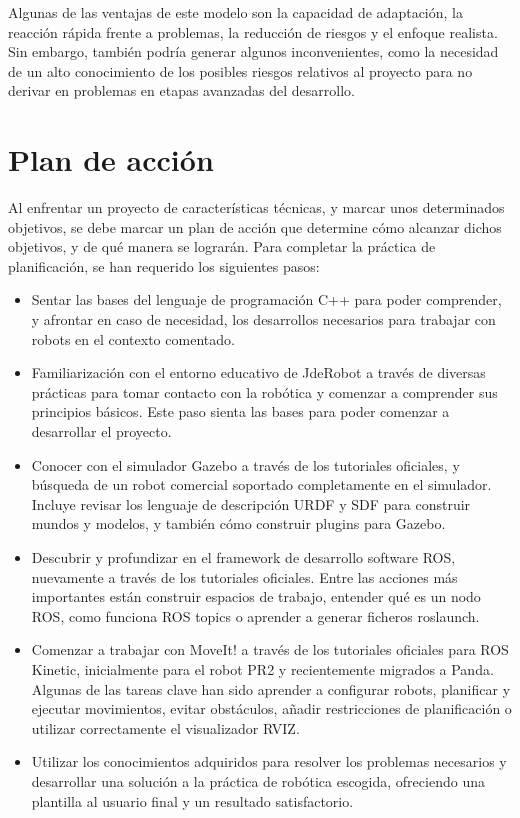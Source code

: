 \documentclass[12pt,spanish,chapterprefix, numbers=noenddot]{book}
\numberwithin{equation}{section}
\numberwithin{figure}{section}
\begin{document}
Algunas de las ventajas de este modelo son la capacidad de adaptación, la reacción rápida frente a problemas, la reducción de riesgos y el enfoque realista. Sin embargo, también podría generar algunos inconvenientes, como la necesidad de un alto conocimiento de los posibles riesgos relativos al proyecto para no derivar en problemas en etapas avanzadas del desarrollo. 

\section{Plan de acción}
Al enfrentar un proyecto de características técnicas, y marcar unos determinados objetivos, se debe marcar un plan de acción que determine cómo alcanzar dichos objetivos, y de qué manera se lograrán. Para completar la práctica de planificación, se han requerido los siguientes pasos: 
\begin{itemize}
    \item Sentar las bases del lenguaje de programación C++ para poder comprender, y afrontar en caso de necesidad, los desarrollos necesarios para trabajar con robots en el contexto comentado. 
    \item Familiarización con el entorno educativo de JdeRobot a través de diversas prácticas para tomar contacto con la robótica y comenzar a comprender sus principios básicos. Este paso sienta las bases para poder comenzar a desarrollar el proyecto. 
    \item Conocer con el simulador Gazebo a través de los tutoriales oficiales, y búsqueda de un robot comercial soportado completamente en el simulador. Incluye revisar los lenguaje de descripción URDF y SDF para construir mundos y modelos, y también cómo construir plugins para Gazebo. 
    \item Descubrir y profundizar en el framework de desarrollo software ROS, nuevamente a través de los tutoriales oficiales. Entre las acciones más importantes están construir espacios de trabajo, entender qué es un nodo ROS, como funciona ROS topics o aprender a generar ficheros roslaunch.
    \item Comenzar a trabajar con MoveIt! a través de los tutoriales oficiales para ROS Kinetic, inicialmente para el robot PR2 y recientemente migrados a Panda. Algunas de las tareas clave han sido aprender a configurar robots, planificar y ejecutar movimientos, evitar obstáculos, añadir restricciones de planificación o utilizar correctamente el visualizador RVIZ. 
    \item Utilizar los conocimientos adquiridos para resolver los problemas necesarios y desarrollar una solución a la práctica de robótica escogida, ofreciendo una plantilla al usuario final y un resultado satisfactorio. 
\end{itemize}
\end{document}
